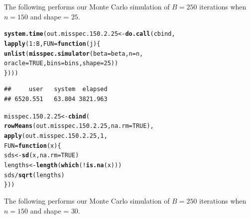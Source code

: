 \documentclass[11pt]{article}\usepackage[]{graphicx}\usepackage[]{color}
\makeatletter
\newcommand{\hlnum}[1]{\textcolor[rgb]{0.686,0.059,0.569}{#1}}%
\newcommand{\hlopt}[1]{\textcolor[rgb]{0,0,0}{#1}}%
\newcommand{\hlstd}[1]{\textcolor[rgb]{0.345,0.345,0.345}{#1}}%
\newcommand{\hlkwa}[1]{\textcolor[rgb]{0.161,0.373,0.58}{\textbf{#1}}}%
\newcommand{\hlkwb}[1]{\textcolor[rgb]{0.69,0.353,0.396}{#1}}%
\newcommand{\hlkwc}[1]{\textcolor[rgb]{0.333,0.667,0.333}{#1}}%
\newcommand{\hlkwd}[1]{\textcolor[rgb]{0.737,0.353,0.396}{\textbf{#1}}}%
\newenvironment{kframe}{%
 \def\at@end@of@kframe{}%
 \ifinner\ifhmode%
  \def\at@end@of@kframe{\end{minipage}}%
  \begin{minipage}{\columnwidth}%
 \fi\fi%
 \def\FrameCommand##1{\hskip\@totalleftmargin \hskip-\fboxsep
 \colorbox{shadecolor}{##1}\hskip-\fboxsep
     \hskip-\linewidth \hskip-\@totalleftmargin \hskip\columnwidth}%
 \MakeFramed {\advance\hsize-\width
   \@totalleftmargin\z@ \linewidth\hsize
   \@setminipage}}%
 {\par\unskip\endMakeFramed%
 \at@end@of@kframe}
\newenvironment{knitrout}{}{} %
\makeatother
\begin{document}
The following performs our Monte Carlo simulation of $B = 250$ iterations 
when $n = 150$ and shape = $25$.

\begin{knitrout}
\color{fgcolor}\begin{kframe}
\begin{alltt}
\hlkwd{system.time}\hlstd{(out.misspec.150.2.25} \hlkwb{<-} \hlkwd{do.call}\hlstd{(cbind,}
  \hlkwd{lapply}\hlstd{(}\hlnum{1}\hlopt{:}\hlstd{B,} \hlkwc{FUN} \hlstd{=} \hlkwa{function}\hlstd{(}\hlkwc{j}\hlstd{)\{}
    \hlkwd{unlist}\hlstd{(}\hlkwd{misspec.simulator}\hlstd{(}\hlkwc{beta} \hlstd{= beta,} \hlkwc{n} \hlstd{= n,}
      \hlkwc{oracle} \hlstd{=} \hlnum{TRUE}\hlstd{,} \hlkwc{bins} \hlstd{= bins,} \hlkwc{shape} \hlstd{=} \hlnum{25}\hlstd{))}
\hlstd{\})))}
\end{alltt}
\begin{verbatim}
##     user   system  elapsed 
## 6520.551   63.804 3821.963
\end{verbatim}
\end{kframe}
\end{knitrout}

\begin{knitrout}
\color{fgcolor}\begin{kframe}
\begin{alltt}
\hlstd{misspec.150.2.25} \hlkwb{<-} \hlkwd{cbind}\hlstd{(}
  \hlkwd{rowMeans}\hlstd{(out.misspec.150.2.25,} \hlkwc{na.rm} \hlstd{=} \hlnum{TRUE}\hlstd{),}
  \hlkwd{apply}\hlstd{(out.misspec.150.2.25,} \hlnum{1}\hlstd{,}
  \hlkwc{FUN} \hlstd{=} \hlkwa{function}\hlstd{(}\hlkwc{x}\hlstd{)\{}
    \hlstd{sds} \hlkwb{<-} \hlkwd{sd}\hlstd{(x,} \hlkwc{na.rm} \hlstd{=} \hlnum{TRUE}\hlstd{)}
    \hlstd{lengths} \hlkwb{<-} \hlkwd{length}\hlstd{(}\hlkwd{which}\hlstd{(}\hlopt{!}\hlkwd{is.na}\hlstd{(x)))}
    \hlstd{sds} \hlopt{/} \hlkwd{sqrt}\hlstd{(lengths)}
  \hlstd{\}))}
\end{alltt}
\end{kframe}
\end{knitrout}


The following performs our Monte Carlo simulation of $B = 250$ iterations 
when $n = 150$ and shape = $30$.
\end{document}
